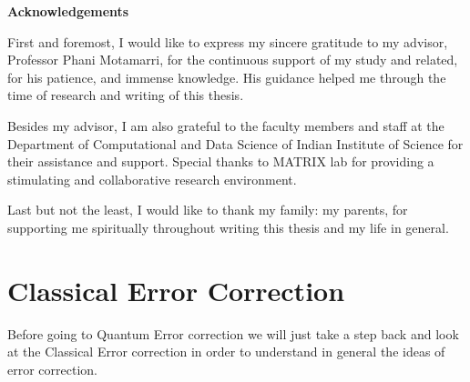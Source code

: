 \documentclass[12pt, oneside]{book}
\theoremstyle{definition}
\theoremstyle{definition}
\theoremstyle{remark}
\newcommand{\acknowledgementsname}{Acknowledgements}
\newenvironment{Acknowledgements}{%
\clearpage
\null\vfill
\begin{center}%
    \bfseries \acknowledgementsname
\end{center}}%
{\vfill\null}
\begin{document}
\begin{Acknowledgements}
First and foremost, I would like to express my sincere gratitude to my advisor,
Professor Phani Motamarri, for the continuous support of my study and related, for
his patience, and immense knowledge.
His guidance helped me through the time of research and writing of this thesis.

Besides my advisor, I am also grateful to the faculty members and staff at the
Department of Computational and Data Science of Indian Institute of Science for
their assistance and support. Special thanks to MATRIX lab for providing a stimulating
and collaborative research environment.

Last but not the least, I would like to thank my family: my parents,
for supporting me spiritually throughout writing this thesis and my life in general.
\end{Acknowledgements}

\tableofcontents

\mainmatter



\chapter{Classical Error Correction}
Before going to Quantum Error correction we will just take a step back and look at the Classical Error correction in order to understand in general the ideas of error correction.
\end{document}
